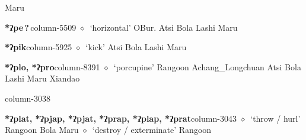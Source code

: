          Maru 
  \item {\footnotesize \textbf{*ʔpe\,?\,}}{\tiny column-5509}
         $\diamond$~`horizontal'
         OBur. 
\hspace{1ex}
         Atsi 
\hspace{1ex}
         Bola 
\hspace{1ex}
         Lashi 
\hspace{1ex}
         Maru 
  \item {\footnotesize \textbf{*ʔpik}}{\tiny column-5925}
         $\diamond$~`kick'
         Atsi 
\hspace{1ex}
         Bola 
\hspace{1ex}
         Lashi 
\hspace{1ex}
         Maru 
  \item {\footnotesize \textbf{*ʔplo, *ʔpro}}{\tiny column-8391}
         $\diamond$~`porcupine'
         Rangoon 
\hspace{1ex}
         Achang\_Longchuan 
\hspace{1ex}
         Atsi 
\hspace{1ex}
         Bola 
\hspace{1ex}
         Lashi 
\hspace{1ex}
         Maru 
\hspace{1ex}
         Xiandao 
  \item {\footnotesize \textbf{}}{\tiny column-3038}
  \item {\footnotesize \textbf{*ʔplat, *ʔpjap, *ʔpjat, *ʔprap, *ʔplap, *ʔprat}}{\tiny column-3043}
         $\diamond$~`throw / hurl'
         Rangoon 
\hspace{1ex}
         Bola 
\hspace{1ex}
         Maru 
\hspace{1ex}
         $\diamond$~`destroy / exterminate'
         Rangoon 
\hspace{1ex}
